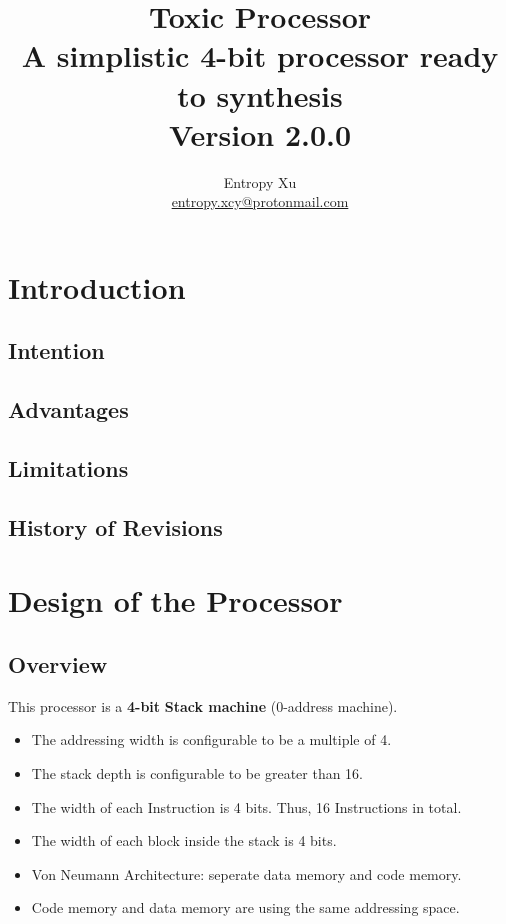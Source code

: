\documentclass[11pt]{book}
\begin{document}
\begin{titlepage}
    \thispagestyle{empty}
    \title{%
    Toxic Processor \\
    \large A simplistic 4-bit processor ready to synthesis \\ 
    Version 2.0.0}
    \author{Entropy Xu \\ 
            \href{mailto:entropy.xcy@protonmail.com}{entropy.xcy@protonmail.com} }
    \maketitle
    \end{titlepage}
    \tableofcontents


    \chapter{Introduction}
    \section{Intention}
    \section{Advantages}
    \section{Limitations}
    \section{History of Revisions}


    \chapter{Design of the Processor}
    \section{Overview}
    This processor is a \textbf{4-bit} \textbf{Stack machine} (0-address machine).
    \begin{itemize}
        \item The addressing width is configurable to be a multiple of 4.
        \item The stack depth is configurable to be greater than 16.
        \item The width of each Instruction is 4 bits. Thus, 16 Instructions in total.
        \item The width of each block inside the stack is 4 bits.
        \item Von Neumann Architecture: seperate data memory and code memory.
        \item Code memory and data memory are using the same addressing space.
    \end{itemize}
\end{document}

